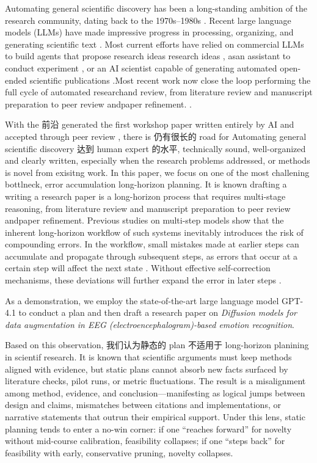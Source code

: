\documentclass[manuscript,review,anonymous]{acmart}
\begin{document}
Automating general scientific discovery has been a long-standing ambition of the research community, dating back to the 1970s–1980s \cite{langley1987scientific}. Recent large language models (LLMs) \cite{achiam2023gpt} have made impressive progress in processing, organizing, and generating scientific text \cite{wang2023scientific}. Most current efforts have relied on commercial LLMs to build agents that propose research ideas research ideas \cite{wang2023scimon,yang2024large,baek2025researchagent}, asan assistant to conduct experiment \cite{du2024llms}, or an AI scientist capable of generating automated open-ended scientific publications \cite{lu2024ai,yamada2025ai}.Most recent work now close the loop performing the full cycle of automated researchand review, from literature review and manuscript preparation to peer review andpaper refinement.  \cite{weng2025cycleresearcher}.

With the 前沿 generated the first workshop paper written entirely by AI and accepted through peer review \cite{yamada2025ai}, there is 仍有很长的 road for Automating general scientific discovery 达到 human expert 的水平,  technically sound, well-organized and clearly written, especially when the research problems addressed, or methods is novel from exisitng work. In this paper, we focus on one of the most challening bottlneck, error accumulation long-horizon planning. It is known drafting a writing a research paper is a long-horizon process that requires multi-stage reasoning, from literature review and manuscript preparation to peer review andpaper refinement. Previous studies on multi-step models show that the inherent long-horizon workflow of such systems inevitably introduces the risk of compounding errors. In the workflow, small mistakes made at earlier steps can accumulate and propagate through subsequent steps, as errors that occur at a certain step will affect the next state \cite{wang2025expressive}. Without effective self-correction mechanisms, these deviations will further expand the error in later steps \cite{han2023expert, venkatraman2015improving, hejna2023improving}.

As a demonstration, we employ the state-of-the-art large language model GPT-4.1 \cite{openai2025gpt41} to conduct a plan and then draft a research paper on \textit{Diffusion models for data augmentation in EEG (electroencephalogram)-based emotion recognition}.

Based on this observation, 我们认为静态的 plan 不适用于 long-horizon planining in scientif research. It is known that scientific arguments must keep methods aligned with evidence, but static plans cannot absorb new facts surfaced by literature checks, pilot runs, or metric fluctuations. The result is a misalignment among method, evidence, and conclusion—manifesting as logical jumps between design and claims, mismatches between citations and implementations, or narrative statements that outrun their empirical support. Under this lens, static planning tends to enter a no-win corner: if one “reaches forward” for novelty without mid-course calibration, feasibility collapses; if one “steps back” for feasibility with early, conservative pruning, novelty collapses.
\end{document}
